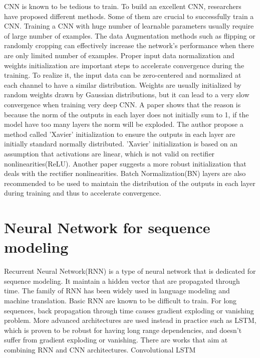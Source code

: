 CNN is known to be tedious to train. To build an excellent CNN, researchers have proposed different methods. Some of them are crucial to successfully train a CNN. Training a CNN with huge number of learnable parameters usually require of large number of examples. The data Augmentation methods such as flipping or randomly cropping can effectively increase the network's performance when there are only limited number of examples. Proper input data normalization and weights initialization are important steps to accelerate convergence during the training. To realize it, the input data can be zero-centered and normalized at each channel to have a similar distribution. Weights are usually initialized by random weights drawn by Gaussian distributions\cite{krizhevsky2012imagenet}, but it can lead to a very slow convergence when training very deep CNN. A paper\cite{glorot2010understanding} shows that the reason is because the norm of the outputs in each layer does not initially sum to 1, if the model have too many layers the norm will be exploded. The author propose a method called 'Xavier' initialization to ensure the outputs in each layer are initially standard normally distributed. 'Xavier' initialization is based on an assumption that activations are linear, which is not valid on rectifier nonlinearities(ReLU). Another paper\cite{he2015delving} suggests a more robust initialization that deals with the rectifier nonlinearities. Batch Normalization(BN) layers are also recommended to be used to maintain the distribution of the outputs in each layer during training and thus to accelerate convergence\cite{krizhevsky2012imagenet}. 

\section{Neural Network for sequence modeling}
Recurrent Neural Network(RNN) is a type of neural network that is dedicated for sequence modeling. It maintain a hidden vector that are propagated through time. The family of RNN has been widely used in language modeling\cite{graves2013generating} and machine translation\cite{sutskever2014sequence}. Basic RNN are known to be difficult to train. For long sequences, back propagation through time causes gradient exploding or vanishing problem. More advanced architectures are used instead in practice such as LSTM, which is proven to be robust for having long range dependencies, and doesn't suffer from gradient exploding or vanishing\cite{hochreiter1997long}. There are works that aim at combining RNN and CNN architectures. Convolutional LSTM



